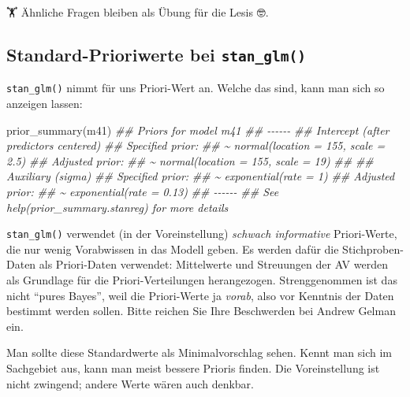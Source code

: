 \documentclass[
  a4paper,
  DIV=11]{scrreprt}
\newenvironment{Shaded}{\begin{snugshade}}{\end{snugshade}}
\newcommand{\DocumentationTok}[1]{\textcolor[rgb]{0.37,0.37,0.37}{\textit{#1}}}
\newcommand{\FunctionTok}[1]{\textcolor[rgb]{0.28,0.35,0.67}{#1}}
\newcommand{\NormalTok}[1]{\textcolor[rgb]{0.00,0.23,0.31}{#1}}
\theoremstyle{definition}
\theoremstyle{remark}
\begin{document}
🏋️ Ähnliche Fragen bleiben als Übung für die Lesis 🤓.

\hypertarget{standard-prioriwerte-bei-stan_glm}{%
\subsection{\texorpdfstring{Standard-Prioriwerte bei
\texttt{stan\_glm()}}{Standard-Prioriwerte bei stan\_glm()}}\label{standard-prioriwerte-bei-stan_glm}}

\texttt{stan\_glm()} nimmt für uns Priori-Wert an. Welche das sind, kann
man sich so anzeigen lassen:

\begin{Shaded}
\begin{Highlighting}[]
\FunctionTok{prior\_summary}\NormalTok{(m41)}
\DocumentationTok{\#\# Priors for model \textquotesingle{}m41\textquotesingle{} }
\DocumentationTok{\#\# {-}{-}{-}{-}{-}{-}}
\DocumentationTok{\#\# Intercept (after predictors centered)}
\DocumentationTok{\#\#   Specified prior:}
\DocumentationTok{\#\#     \textasciitilde{} normal(location = 155, scale = 2.5)}
\DocumentationTok{\#\#   Adjusted prior:}
\DocumentationTok{\#\#     \textasciitilde{} normal(location = 155, scale = 19)}
\DocumentationTok{\#\# }
\DocumentationTok{\#\# Auxiliary (sigma)}
\DocumentationTok{\#\#   Specified prior:}
\DocumentationTok{\#\#     \textasciitilde{} exponential(rate = 1)}
\DocumentationTok{\#\#   Adjusted prior:}
\DocumentationTok{\#\#     \textasciitilde{} exponential(rate = 0.13)}
\DocumentationTok{\#\# {-}{-}{-}{-}{-}{-}}
\DocumentationTok{\#\# See help(\textquotesingle{}prior\_summary.stanreg\textquotesingle{}) for more details}
\end{Highlighting}
\end{Shaded}

\texttt{stan\_glm()} verwendet (in der Voreinstellung) \emph{schwach
informative} Priori-Werte, die nur wenig Vorabwissen in das Modell
geben. Es werden dafür die Stichproben-Daten als Priori-Daten verwendet:
Mittelwerte und Streuungen der AV werden als Grundlage für die
Priori-Verteilungen herangezogen. Strenggenommen ist das nicht ``pures
Bayes'', weil die Priori-Werte ja \emph{vorab}, also vor Kenntnis der
Daten bestimmt werden sollen. Bitte reichen Sie Ihre Beschwerden bei
Andrew Gelman ein.

Man sollte diese Standardwerte als Minimalvorschlag sehen. Kennt man
sich im Sachgebiet aus, kann man meist bessere Prioris finden. Die
Voreinstellung ist nicht zwingend; andere Werte wären auch denkbar.
\end{document}
